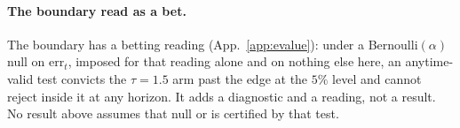 \paragraph{The boundary read as a bet.} The boundary has a betting reading
(App.~\ref{app:evalue}): under a Bernoulli$(\alpha)$ null on $\mathrm{err}_t$, imposed
for that reading alone and on nothing else here, an anytime-valid test
convicts the $\tau = 1.5$ arm past the edge at the $5\%$ level and cannot reject inside it at any
horizon. It adds a diagnostic and a reading, not a result. No
result above assumes that null or is certified by that test.
